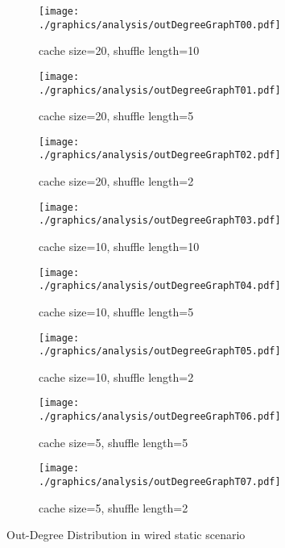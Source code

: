 \begin{figure}
\begin{subfigure}{.5\textwidth}
	\texttt{[image: ./graphics/analysis/outDegreeGraphT00.pdf]}
	\caption{cache size=20, shuffle
	length=10}
	\label{fig:outDegreeDistT00small}
\end{subfigure}%
\begin{subfigure}{.5\textwidth}
	\texttt{[image: ./graphics/analysis/outDegreeGraphT01.pdf]}
	\caption{cache size=20, shuffle
	length=5}
	\label{fig:outDegreeDistT01small}
\end{subfigure}
\begin{subfigure}{.5\textwidth}
	\texttt{[image: ./graphics/analysis/outDegreeGraphT02.pdf]}
	\caption{cache size=20, shuffle
	length=2}
	\label{fig:outDegreeDistT02small}
\end{subfigure}%
\begin{subfigure}{.5\textwidth}
	\texttt{[image: ./graphics/analysis/outDegreeGraphT03.pdf]}
	\caption{cache size=10, shuffle
	length=10}
	\label{fig:outDegreeDistT03small}
\end{subfigure}
\begin{subfigure}{.5\textwidth}
	\texttt{[image: ./graphics/analysis/outDegreeGraphT04.pdf]}
	\caption{cache size=10, shuffle
	length=5}
	\label{fig:outDegreeDistT04small}
\end{subfigure}%
\begin{subfigure}{.5\textwidth}
	\texttt{[image: ./graphics/analysis/outDegreeGraphT05.pdf]}
	\caption{cache size=10, shuffle
	length=2}
	\label{fig:outDegreeDistT05small}
\end{subfigure}
\begin{subfigure}{.5\textwidth}
	\texttt{[image: ./graphics/analysis/outDegreeGraphT06.pdf]}
	\caption{cache size=5, shuffle
	length=5}
	\label{fig:outDegreeDistT06small}
\end{subfigure}%
\begin{subfigure}{.5\textwidth}
	\texttt{[image: ./graphics/analysis/outDegreeGraphT07.pdf]}
	\caption{cache size=5, shuffle
	length=2}
	\label{fig:outDegreeDistT07small}
\end{subfigure}
\caption{Out-Degree Distribution in wired static scenario}
\end{figure}

